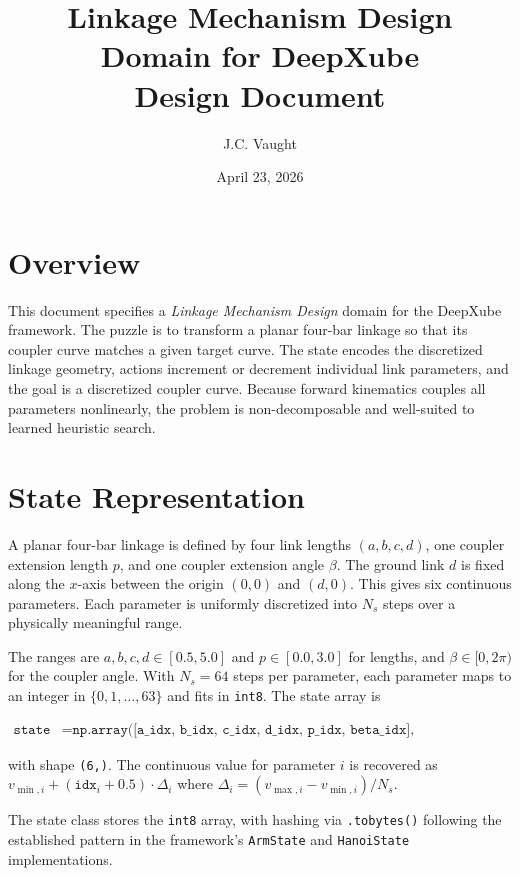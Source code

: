 \documentclass[11pt]{article}
\title{\textbf{Linkage Mechanism Design Domain for DeepXube} \\ \large Design Document}
\author{J.C. Vaught}
\date{April 23, 2026}
\begin{document}
\maketitle

\section{Overview}

This document specifies a \textit{Linkage Mechanism Design} domain for the DeepXube framework. The puzzle is to transform a planar four-bar linkage so that its coupler curve matches a given target curve. The state encodes the discretized linkage geometry, actions increment or decrement individual link parameters, and the goal is a discretized coupler curve. Because forward kinematics couples all parameters nonlinearly, the problem is non-decomposable and well-suited to learned heuristic search.

\section{State Representation}

A planar four-bar linkage is defined by four link lengths $(a, b, c, d)$, one coupler extension length $p$, and one coupler extension angle $\beta$. The ground link $d$ is fixed along the $x$-axis between the origin $(0,0)$ and $(d, 0)$. This gives six continuous parameters. Each parameter is uniformly discretized into $N_s$ steps over a physically meaningful range.

The ranges are $a, b, c, d \in [0.5, 5.0]$ and $p \in [0.0, 3.0]$ for lengths, and $\beta \in [0, 2\pi)$ for the coupler angle. With $N_s = 64$ steps per parameter, each parameter maps to an integer in $\{0, 1, \ldots, 63\}$ and fits in \texttt{int8}. The state array is

\begin{align}
    \texttt{state} &= \texttt{np.array([a\_idx, b\_idx, c\_idx, d\_idx, p\_idx, beta\_idx], dtype=np.int8)}
\end{align}

with shape \texttt{(6,)}. The continuous value for parameter $i$ is recovered as $v_{\min,i} + (\texttt{idx}_i + 0.5) \cdot \Delta_i$ where $\Delta_i = (v_{\max,i} - v_{\min,i}) / N_s$.

The state class stores the \texttt{int8} array, with hashing via \texttt{.tobytes()} following the established pattern in the framework's \texttt{ArmState} and \texttt{HanoiState} implementations.
\end{document}
